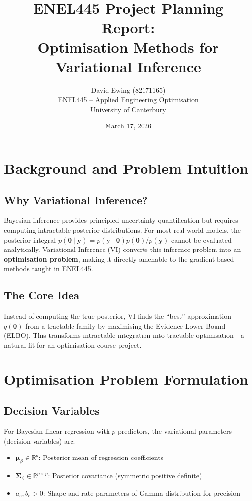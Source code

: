 \documentclass[11pt]{article}
\title{ENEL445 Project Planning Report:\\
Optimisation Methods for Variational Inference}
\author{David Ewing (82171165)\\
ENEL445 -- Applied Engineering Optimisation\\
University of Canterbury}
\date{March 17, 2026}
\newcommand{\R}{\mathbb{R}}
\begin{document}
\maketitle

\section{Background and Problem Intuition}

\subsection{Why Variational Inference?}

Bayesian inference provides principled uncertainty quantification but requires computing intractable posterior distributions. For most real-world models, the posterior integral $p(\bm{\theta} \mid \bm{y}) = p(\bm{y} \mid \bm{\theta})p(\bm{\theta})/p(\bm{y})$ cannot be evaluated analytically. Variational Inference (VI) converts this inference problem into an \textbf{optimisation problem}, making it directly amenable to the gradient-based methods taught in ENEL445.

\subsection{The Core Idea}

Instead of computing the true posterior, VI finds the ``best'' approximation $q(\bm{\theta})$ from a tractable family by maximising the Evidence Lower Bound (ELBO). This transforms intractable integration into tractable optimisation---a natural fit for an optimisation course project.

\section{Optimisation Problem Formulation}

\subsection{Decision Variables}

For Bayesian linear regression with $p$ predictors, the variational parameters (decision variables) are:
\begin{itemize}
\item $\bm{\mu}_\beta \in \R^p$: Posterior mean of regression coefficients
\item $\bm{\Sigma}_\beta \in \R^{p \times p}$: Posterior covariance (symmetric positive definite)
\item $a_e, b_e > 0$: Shape and rate parameters of Gamma distribution for precision
\end{itemize}
\end{document}
